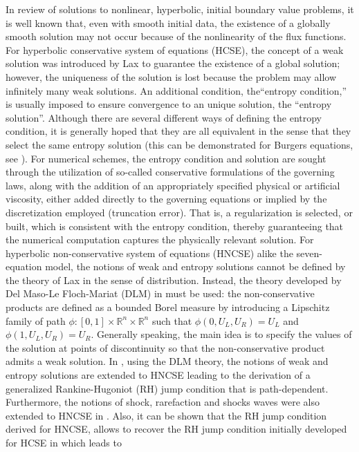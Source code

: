 In review of solutions to nonlinear, hyperbolic, initial boundary value problems, it is well known that, even with smooth initial data, the existence of a 
globally smooth solution may not occur because of the nonlinearity of the flux functions. For hyperbolic conservative system of equations (HCSE), the concept of a weak
solution was introduced by Lax \cite{Lax} to guarantee the existence of a global solution; however, the uniqueness of the solution is lost because the problem may
allow infinitely many weak solutions.  An additional condition, the``entropy condition,'' is usually imposed to ensure convergence to an
unique solution, the ``entropy solution''.
Although there are several different ways of defining the entropy condition, it is generally hoped that they are all equivalent in the sense 
that they select the same entropy solution (this can be demonstrated for Burgers equations, see \cite{Evans1998,Lellis_minimalentropy}).
For numerical schemes, the entropy condition and solution are sought through the utilization of so-called conservative formulations of the 
governing laws, along with the addition of an appropriately specified physical or artificial viscosity, either added directly to the governing 
equations or implied by the discretization employed (truncation error).  That is, a regularization is selected, or built, which is consistent with the 
entropy condition, thereby guaranteeing that the numerical computation captures the physically relevant solution. For hyperbolic non-conservative system of equations
(HNCSE) alike the seven-equation model, the notions of weak and entropy solutions cannot be defined by the theory of Lax in the sense of distribution. Instead, the theory developed by Del Maso-Le Floch-Mariat (DLM)
in \cite{dlm} must be used: the non-conservative products are defined as a bounded Borel 
measure by introducing a Lipschitz family of path $\phi: [0,1] \times \mathbb{R}^n \times \mathbb{R}^n$ such that 
$\phi(0, U_L, U_R) = U_L$ and $\phi(1, U_L, U_R) = U_R$. Generally speaking, the main idea is to specify the values of the 
solution at points of discontinuity so that the non-conservative product admits a weak solution. In \cite{lefloch_1988,lefloch_1989}, 
using the DLM theory, the notions of weak and entropy solutions are extended to HNCSE leading to the derivation of a generalized Rankine-Hugoniot (RH) jump condition
that is path-dependent. Furthermore, the notions of shock, rarefaction and shocks waves were also extended to HNCSE in \cite{lefloch_liu_1993}. Also,
it can be shown that the RH jump condition derived for HNCSE, allows to recover the RH jump condition initially developed for HCSE in \cite{Lax} which leads to
